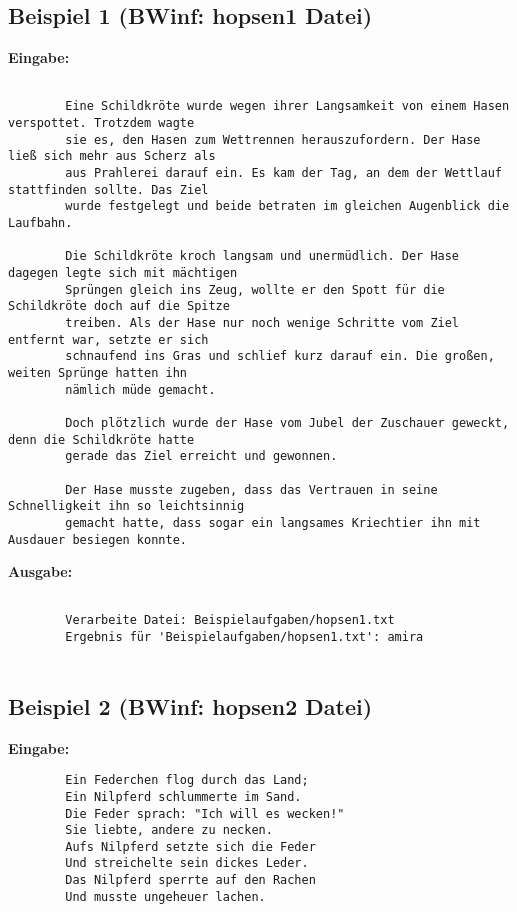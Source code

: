 \documentclass[a4paper,10pt,ngerman]{scrartcl}
\begin{document}
	\subsection{Beispiel 1 (BWinf: hopsen1 Datei)}
	\textbf{Eingabe:}
	\begin{verbatim}
		
		Eine Schildkröte wurde wegen ihrer Langsamkeit von einem Hasen verspottet. Trotzdem wagte 
		sie es, den Hasen zum Wettrennen herauszufordern. Der Hase ließ sich mehr aus Scherz als 
		aus Prahlerei darauf ein. Es kam der Tag, an dem der Wettlauf stattfinden sollte. Das Ziel 
		wurde festgelegt und beide betraten im gleichen Augenblick die Laufbahn.
		
		Die Schildkröte kroch langsam und unermüdlich. Der Hase dagegen legte sich mit mächtigen 
		Sprüngen gleich ins Zeug, wollte er den Spott für die Schildkröte doch auf die Spitze 
		treiben. Als der Hase nur noch wenige Schritte vom Ziel entfernt war, setzte er sich 
		schnaufend ins Gras und schlief kurz darauf ein. Die großen, weiten Sprünge hatten ihn 
		nämlich müde gemacht.
		
		Doch plötzlich wurde der Hase vom Jubel der Zuschauer geweckt, denn die Schildkröte hatte 
		gerade das Ziel erreicht und gewonnen.
		
		Der Hase musste zugeben, dass das Vertrauen in seine Schnelligkeit ihn so leichtsinnig 
		gemacht hatte, dass sogar ein langsames Kriechtier ihn mit Ausdauer besiegen konnte.
	\end{verbatim}
	
	\textbf{Ausgabe:}
	\begin{verbatim} 
		
		Verarbeite Datei: Beispielaufgaben/hopsen1.txt
		Ergebnis für 'Beispielaufgaben/hopsen1.txt': amira
		
	\end{verbatim}
	
	\subsection{Beispiel 2 (BWinf: hopsen2	 Datei)}
	\textbf{Eingabe:}
	\begin{verbatim}
		Ein Federchen flog durch das Land;
		Ein Nilpferd schlummerte im Sand.
		Die Feder sprach: "Ich will es wecken!"
		Sie liebte, andere zu necken.
		Aufs Nilpferd setzte sich die Feder
		Und streichelte sein dickes Leder.
		Das Nilpferd sperrte auf den Rachen
		Und musste ungeheuer lachen.
	\end{verbatim}
	
\end{document}

